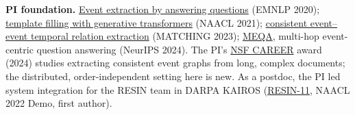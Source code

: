\documentclass[11pt]{article}
\newcommand{\head}[1]{{\color{navy}\textbf{#1}}\enspace}
\begin{document}
\head{PI foundation.} \href{https://doi.org/10.18653/v1/2020.emnlp-main.49}{Event extraction by answering questions} (EMNLP 2020); \href{https://doi.org/10.18653/v1/2021.naacl-main.70}{template filling with generative transformers} (NAACL 2021); \href{https://doi.org/10.18653/v1/2023.matching-1.3}{consistent event--event temporal relation extraction} (MATCHING 2023); \href{https://proceedings.neurips.cc/paper_files/paper/2024/hash/e560a0b22e4432003d0dba63ff8dc457-Abstract.html}{MEQA}, multi-hop event-centric question answering (NeurIPS 2024). The PI's \href{https://www.nsf.gov/awardsearch/showAward?AWD_ID=2340435}{NSF CAREER} award (2024) studies extracting consistent event graphs from long, complex documents; the distributed, order-independent setting here is new. As a postdoc, the PI led system integration for the RESIN team in DARPA KAIROS (\href{https://doi.org/10.18653/v1/2022.naacl-demo.7}{\mbox{RESIN-11}}, NAACL 2022 Demo, first author).
\end{document}
